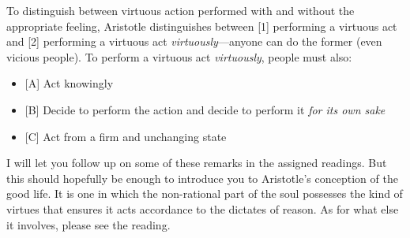 \documentclass[oneside]{article}
\begin{document}
To distinguish between virtuous action performed with and without the appropriate feeling, Aristotle distinguishes between [1] performing a virtuous act and [2] performing a virtuous act \emph{virtuously}---anyone can do the former (even vicious people). To perform a virtuous act \emph{virtuously}, people must also:
\begin{itemize}
\item{[A] Act knowingly
}\item{[B] Decide to perform the action and decide to perform it \emph{for its own sake}}\item{[C] Act from a firm and unchanging state}\end{itemize}
I will let you follow up on some of these remarks in the assigned readings. But this should hopefully be enough to introduce you to Aristotle's conception of the good life. It is one in which the non-rational part of the soul possesses the kind of virtues that ensures it acts accordance to the dictates of reason. As for what else it involves, please see the reading. 
\end{document}
